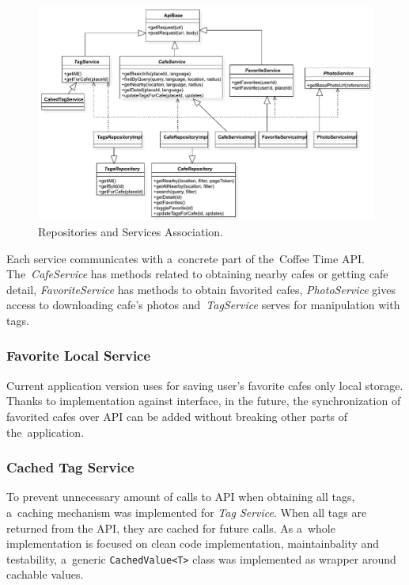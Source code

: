 \begin{figure}[ht]
    \centering
    \includegraphics[width=\textwidth]{img/implementation/repo-services.pdf}
    \caption{Repositories and Services Association.}
    \label{fig:ct-repo-services}
\end{figure}

Each service communicates with a~concrete part of the~Coffee Time API. The~\textit{CafeService} has methods related to obtaining nearby cafes or getting cafe detail, \textit{FavoriteService} has methods to obtain favorited cafes, \textit{PhotoService} gives access to downloading cafe's photos and~\textit{TagService} serves for manipulation with tags.

\subsubsection{Favorite Local Service}
Current application version uses for saving user's favorite cafes only local storage. Thanks to implementation against interface, in the future, the synchronization of favorited cafes over API can be added without breaking other parts of the~application. 

\subsubsection{Cached Tag Service}
To prevent unnecessary amount of calls to API when obtaining all tags, a~caching mechanism was implemented for \textit{Tag Service}. When all tags are returned from the API, they are cached for future calls. As a~whole implementation is focused on clean code implementation, maintainbality and testability, a~generic \verb|CachedValue<T>| class was implemented as wrapper around cachable values. 

